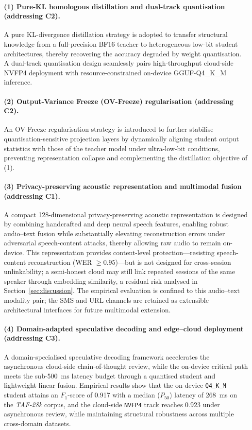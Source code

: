 \documentclass[a4paper,fleqn]{cas-sc}
\begin{document}
\paragraph{(1) Pure-KL homologous distillation and dual-track quantisation (addressing C2).}
A pure KL-divergence distillation strategy is adopted to transfer structural knowledge from a full-precision BF16 teacher to heterogeneous low-bit student architectures, thereby recovering the accuracy degraded by weight quantisation. A dual-track quantisation design seamlessly pairs high-throughput cloud-side NVFP4 deployment with resource-constrained on-device GGUF-Q4\_K\_M inference.

\paragraph{(2) Output-Variance Freeze (OV-Freeze) regularisation (addressing C2).}
An OV-Freeze regularisation strategy is introduced to further stabilise quantisation-sensitive projection layers by dynamically aligning student output statistics with those of the teacher model under ultra-low-bit conditions, preventing representation collapse and complementing the distillation objective of (1).

\paragraph{(3) Privacy-preserving acoustic representation and multimodal fusion (addressing C1).}
A compact 128-dimensional privacy-preserving acoustic representation is designed by combining handcrafted and deep neural speech features, enabling robust audio--text fusion while substantially elevating reconstruction errors under adversarial speech-content attacks, thereby allowing raw audio to remain on-device. This representation provides content-level protection---resisting speech-content reconstruction (WER $\ge 0.95$)---but is not designed for cross-session unlinkability; a semi-honest cloud may still link repeated sessions of the same speaker through embedding similarity, a residual risk analysed in Section~\ref{sec:discussion}. The empirical evaluation is confined to this audio--text modality pair; the SMS and URL channels are retained as extensible architectural interfaces for future multimodal extension.

\paragraph{(4) Domain-adapted speculative decoding and edge--cloud deployment (addressing C3).}
A domain-specialised speculative decoding framework accelerates the asynchronous cloud-side chain-of-thought review, while the on-device critical path meets the sub-500~ms latency budget through a quantised student and lightweight linear fusion. Empirical results show that the on-device \texttt{Q4\_K\_M} student attains an $F_1$-score of 0.917 with a median ($P_{50}$) latency of 268~ms on the \textit{TAF-28k} corpus, and the cloud-side \texttt{NVFP4} track reaches 0.923 under asynchronous review, while maintaining structural robustness across multiple cross-domain datasets.
\end{document}
